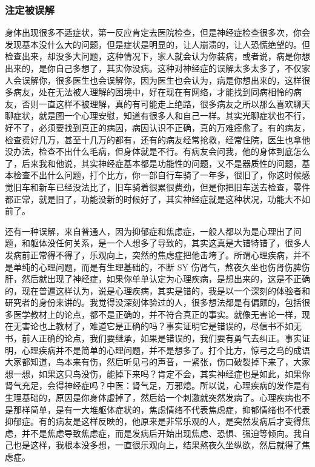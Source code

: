 \documentclass[fontset=founder]{ctexart}
\begin{document}
\subsubsection{注定被误解}

身体出现很多不适症状，第一反应肯定去医院检查，但是神经症检查很多次，你会发现基本没什么大的问题，但是症状是明显的，让人崩溃的，让人恐慌绝望的。但检查出来，却没多大问题，这种情况下，家人就会认为你装病，或者说，病是你想出来的，是你自己多想了，其实你没病。这种对神经症的误解太多太多了，不仅家人会误解你，很多医生也会误解你，因为医生也会认为，病是你想出来的，这样很多病友，处在无法被人理解的困境中，好在现在有网络，才能找到同病相怜的病友，否则一直这样不被理解，真的有可能走上绝路，很多病友之所以那么喜欢聊天聊症状，就是图一个心理安慰，知道有很多人和自己一样。其实光聊症状也不行，好不了，必须要找到真正的病因，病因认识不正确，真的万难痊愈了。有的病友，检查费好几万，甚至十几万的都有，还有的病友经常抢救，经常住院，医生也拿他没办法，检查不出什么毛病，但身体就是不行。有病友会问我，他的身体到底怎么了，后来我和他说，其实神经症基本都是功能性的问题，又不是器质性的问题，基本检查不出什么问题，打个比方，你一部自行车骑了一年多，很旧了，你这时候感觉旧车和新车已经没法比了，旧车骑着很累很费劲，但是你把旧车送去检查，零件都正常，就是旧了，功能没新的时候好了，其实神经症就是这种状况，功能大不如前了。

还有一种误解，来自普通人，因为抑郁症和焦虑症，一般人都以为是心理出了问题，和躯体没任何关系，是一个人想多了导致的，其实这真是大错特错了，很多人发病前正常得不得了，乐观向上，突然的焦虑症把他击垮了。所谓心理疾病，并不是单纯的心理问题，而是有生理基础的，不断 SY 伤肾气，熬夜久坐也伤肾伤脾伤肝，然后就出现了神经症，如果你单单认定为心理疾病，是想出来的，这是不正确的，现在普遍这样认为，说是心理疾病，其实是错的，我是以一个深刻的体验者和研究者的身份来讲的。我觉得没深刻体验过的人，很多想法都是有偏颇的，包括很多医学教材上的论点，都不是正确的，并不符合真正的事实。就像无害论一样，现在无害论也上教材了，难道它是正确的吗？事实证明它是错误的，尽信书不如无书，前人正确的论点，我们要继承，如果是错误的，我们要有勇气去纠正。事实证明，心理疾病并不是简单的心理问题，并不是想多了。打个比方，惊弓之鸟的成语大家都知道，鸟本来有伤，然后听见弓的声音，一紧张，伤口破裂掉下来了，大家想一想，如果这只鸟没伤，能掉下来吗？肯定不会，其实神经症也是如此，如果你肾气充足，会得神经症吗？中医：肾气足，万邪熄。所以说，心理疾病的发作是有生理基础的，原因是你身体虚掉了，然后给一个刺激就突然发病了。心理疾病也不是那样简单，是有一大堆躯体症状的，焦虑情绪不代表焦虑症，抑郁情绪也不代表抑郁症。有的病友是这样反映的，他原来是非常乐观的人，是突然发病后才变得焦虑，并不是焦虑导致焦虑症，而是发病后开始出现焦虑、恐惧、强迫等倾向。我自己也是这样，我根本没多想，一直很乐观向上，结果熬夜久坐纵欲，然后就得了焦虑症。
\end{document}
